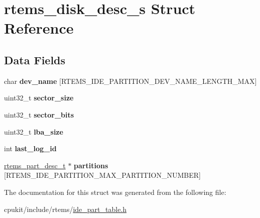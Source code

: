 \hypertarget{structrtems__disk__desc__s}{}\section{rtems\+\_\+disk\+\_\+desc\+\_\+s Struct Reference}
\label{structrtems__disk__desc__s}
\subsection*{Data Fields}
\begin{DoxyCompactItemize}
\item 
\mbox{\label{structrtems__disk__desc__s_a1a7e36dd6ee53929878fc41c8bb51ec0}} 
char {\bfseries dev\+\_\+name} \mbox{[}R\+T\+E\+M\+S\+\_\+\+I\+D\+E\+\_\+\+P\+A\+R\+T\+I\+T\+I\+O\+N\+\_\+\+D\+E\+V\+\_\+\+N\+A\+M\+E\+\_\+\+L\+E\+N\+G\+T\+H\+\_\+\+M\+AX\mbox{]}
\item 
\mbox{\label{structrtems__disk__desc__s_a7160866ec8c784cf19c048d136b2daa4}} 
uint32\+\_\+t {\bfseries sector\+\_\+size}
\item 
\mbox{\label{structrtems__disk__desc__s_a037309c12f2cad729ff2ef66cc37ce7b}} 
uint32\+\_\+t {\bfseries sector\+\_\+bits}
\item 
\mbox{\label{structrtems__disk__desc__s_a2282b482afb19f8ccc8afda2759349de}} 
uint32\+\_\+t {\bfseries lba\+\_\+size}
\item 
\mbox{\label{structrtems__disk__desc__s_ac54b9347e3c6e53eaa69c97ffb96afd3}} 
int {\bfseries last\+\_\+log\+\_\+id}
\item 
\mbox{\label{structrtems__disk__desc__s_a0732b3611a34e4b067e4a9fccbf09302}} 
\mbox{\hyperlink{structrtems__part__desc__s}{rtems\+\_\+part\+\_\+desc\+\_\+t}} $\ast$ {\bfseries partitions} \mbox{[}R\+T\+E\+M\+S\+\_\+\+I\+D\+E\+\_\+\+P\+A\+R\+T\+I\+T\+I\+O\+N\+\_\+\+M\+A\+X\+\_\+\+P\+A\+R\+T\+I\+T\+I\+O\+N\+\_\+\+N\+U\+M\+B\+ER\mbox{]}
\end{DoxyCompactItemize}


The documentation for this struct was generated from the following file\+:\begin{DoxyCompactItemize}
\item 
cpukit/include/rtems/\mbox{\hyperlink{ide__part__table_8h}{ide\+\_\+part\+\_\+table.\+h}}\end{DoxyCompactItemize}
